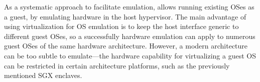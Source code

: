 

As a systematic approach to facilitate emulation,
 allows running existing OSes as a guest,
by emulating hardware in the host hypervisor.
The main advantage of using virtualization for OS emulation is to keep the host interface generic to different guest OSes,
so a successfully hardware emulation
can apply to numerous guest OSes of the same hardware architecture.
However, a modern architecture can be too subtle to emulate---the hardware capability for virtualizing a guest OS
can be restricted in certain architecture platforms,
such as the previously mentioned SGX enclaves.



